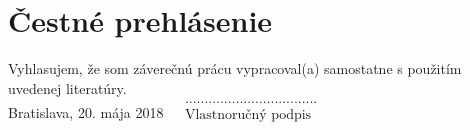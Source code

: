 \null
\vfill
\noindent
\section*{Čestné prehlásenie}

Vyhlasujem, že som záverečnú prácu vypracoval(a) samostatne s použitím uvedenej literatúry.\\

\noindent Bratislava, 20. mája 2018 \hfill $\begin{array}{rl}
                                          &\text{..................................}\\
                                          &\text{Vlastnoručný podpis}\\
                                           \end{array}$
\cleardoublepage


	
